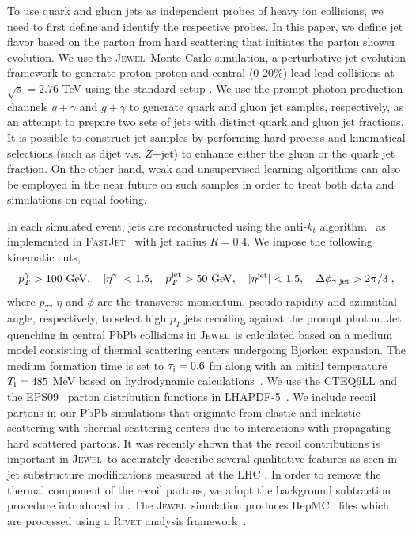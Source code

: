 \documentclass[notoc,preprintnumbers]{JHEP3}
\newcommand{\text}[1]{{\rm #1}}
\newcommand{\jw}{\textsc{Jewel}~}
\begin{document}
To use quark and gluon jets as independent probes of heavy ion collisions, we need to first define and identify the respective probes. In this paper, we define jet flavor based on the parton from hard scattering that initiates the parton shower evolution. We use the \jw Monte Carlo simulation, a perturbative jet evolution framework to generate proton-proton and central (0-20\%) lead-lead collisions at $\sqrt{s}=2.76$ TeV using the standard setup \cite{Zapp:2013zya}. We use the prompt photon production channels \cite{KunnawalkamElayavalli:2016ttl} $q +\gamma$ and $g +\gamma$ to generate quark and gluon jet samples, respectively, as an attempt to prepare two sets of jets with distinct quark and gluon jet fractions. It is possible to construct jet samples by performing hard process and kinematical selections (such as dijet v.s. $Z$+jet) to enhance either the gluon or the quark jet fraction. On the other hand, weak and unsupervised learning algorithms \cite{Metodiev:2017vrx,Komiske:2018oaa,Metodiev:2018ftz} can also be employed in the near future on such samples in order to treat both data and simulations on equal footing.

In each simulated event, jets are reconstructed using the anti-$k_t$ algorithm~\cite{Cacciari:2008gp} as implemented in \textsc{FastJet}~\cite{Cacciari:2011ma} with jet radius $R = 0.4$. We impose the following kinematic cuts,
\begin{equation}
    p^{\gamma}_T > 100~{\rm GeV}, ~~~ |\eta^{\rm \gamma}|<1.5, ~~~ p^{\rm jet}_T > 50~{\rm GeV}, ~~~ |\eta^{\rm jet}|<1.5, ~~~\Delta \phi_{\gamma, {\rm jet}} > 2\pi/3\;,
\end{equation}
where $p_T$, $\eta$ and $\phi$ are the transverse momentum, pseudo rapidity and azimuthal angle, respectively, to select high $p_T$ jets recoiling against the prompt photon. Jet quenching in central PbPb collisions in \jw is calculated based on a medium model consisting of thermal scattering centers undergoing Bjorken expansion. The medium formation time is set to $\tau_\text{i}=0.6 $ fm along with an initial temperature $T_\text{i}=485$ MeV based on hydrodynamic calculations~\cite{Shen:2012vn,Shen:2014vra}. We use the \textsc{CTEQ6LL} \cite{Pumplin:2002vw} and the \textsc{EPS09}~\cite{Eskola:2009uj} parton distribution functions in \textsc{LHAPDF-5}~\cite{Whalley:2005nh}. We include recoil partons in our PbPb simulations that originate from elastic and inelastic scattering with thermal scattering centers due to interactions with propagating hard scattered partons. It was recently shown that the recoil contributions is important in \jw to accurately describe several qualitative features as seen in jet substructure modifications measured at the LHC \cite{KunnawalkamElayavalli:2017hxo,Milhano:2017nzm}. In order to remove the thermal component of the recoil partons, we adopt the background subtraction procedure introduced in \cite{KunnawalkamElayavalli:2017hxo,Milhano:2017nzm}. The \jw simulation produces HepMC~\cite{Dobbs:2001ck} files which are processed using a \textsc{Rivet} analysis framework~\cite{Buckley:2010ar}.
\end{document}
